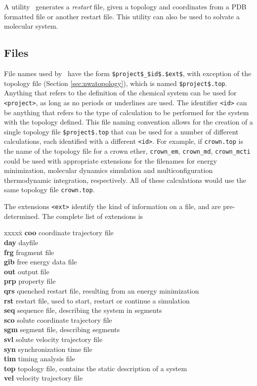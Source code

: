 A utility \nwrst\ generates a {\it restart} file, given a topology
and coordinates from a PDB formatted file or another restart file.
This utility can also be used to solvate a molecular system.

\subsection{Files}
\label{sec:nwafilenames}

File names used by \nwargos\ have the form \verb+$project$_$id$.$ext$+, with
exception of the topology file (Section \ref{sec:nwatopology}), which is named 
\verb+$project$.top+.
Anything that refers to the definition of the chemical system can be used
for \verb+<project>+, as long as no periods or underlines are used.
The identifier \verb+<id>+ can be anything that refers to the type of 
calculation to be performed for the system with the topology defined.
This file naming convention allows for the creation of a single
topology file \verb+$project$.top+ that can be used for a number of 
different calculations, each identified with a different \verb+<id>+.
For example, if {\tt crown.top} is the name of the topology file for
a crown ether, {\tt crown\_em}, {\tt crown\_md}, {\tt crown\_mcti} could
be used with appropriate extensions for the filenames for energy
minimization, molecular dynamics simulation and multiconfiguration
thermodynamic integration, respectively. All of these calculations
would use the same topology file {\tt crown.top}.

\label{sec:nwaextensions}

The extensions \verb+<ext>+ identify the kind of information on a file,
and are pre-determined. 
The complete list of extensions is
\begin{tabbing}
xxxxx\=\kill
{\bf coo} \> coordinate trajectory file\\
{\bf day} \> dayfile\\
{\bf frg} \> fragment file\\
{\bf gib} \> free energy data file\\
{\bf out} \> output file\\
{\bf prp} \> property file\\
{\bf qrs} \> quenched restart file, resulting from an energy minimization\\
{\bf rst} \> restart file, used to start, restart or continue a simulation \\
{\bf seq} \> sequence file, describing the system in segments\\
{\bf sco} \> solute coordinate trajectory file\\
{\bf sgm} \> segment file, describing segments\\
{\bf svl} \> solute velocity trajectory file\\
{\bf syn} \> synchronization time file\\
{\bf tim} \> timing analysis file\\
{\bf top} \> topology file, contains the static description of a system\\
{\bf vel} \> velocity trajectory file\\
\end{tabbing}

